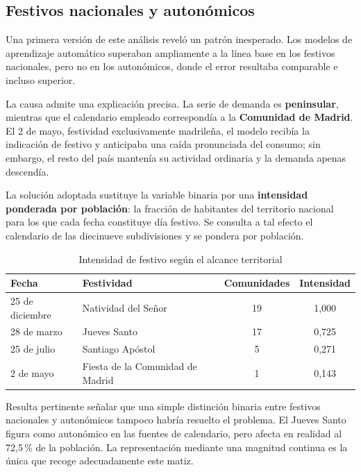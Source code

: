 \subsection*{Festivos nacionales y autonómicos}

Una primera versión de este análisis reveló un patrón inesperado. Los modelos de
aprendizaje automático superaban ampliamente a la línea base en los festivos
nacionales, pero no en los autonómicos, donde el error resultaba comparable e
incluso superior.

La causa admite una explicación precisa. La serie de demanda es
\textbf{peninsular}, mientras que el calendario empleado correspondía a la
\textbf{Comunidad de Madrid}. El 2 de mayo, festividad exclusivamente madrileña,
el modelo recibía la indicación de festivo y anticipaba una caída pronunciada del
consumo; sin embargo, el resto del país mantenía su actividad ordinaria y la
demanda apenas descendía.

La solución adoptada sustituye la variable binaria por una \textbf{intensidad
ponderada por población}: la fracción de habitantes del territorio nacional para
los que cada fecha constituye día festivo. Se consulta a tal efecto el calendario
de las diecinueve subdivisiones y se pondera por población.

\begin{table}[H]
\centering
\caption{Intensidad de festivo según el alcance territorial}
\label{tab:intensidad}
\begin{tabular}{|l|l|c|c|}
\hline
\rowcolor{grisclaro}
\textbf{Fecha} & \textbf{Festividad} & \textbf{Comunidades} & \textbf{Intensidad} \\
\hline
25 de diciembre & Natividad del Señor & 19 & 1,000 \\
\hline
28 de marzo & Jueves Santo & 17 & 0,725 \\
\hline
25 de julio & Santiago Apóstol & 5 & 0,271 \\
\hline
2 de mayo & Fiesta de la Comunidad de Madrid & 1 & 0,143 \\
\hline
\end{tabular}
\end{table}

Resulta pertinente señalar que una simple distinción binaria entre festivos
nacionales y autonómicos tampoco habría resuelto el problema. El Jueves Santo
figura como autonómico en las fuentes de calendario, pero afecta en realidad al
72,5\,\% de la población. La representación mediante una magnitud continua es la
única que recoge adecuadamente este matiz.


